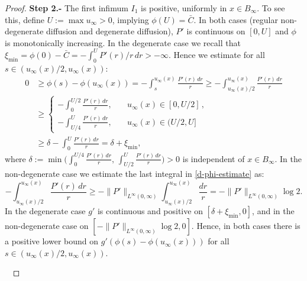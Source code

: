 \documentclass[10pt,a4paper]{amsart}
\newcommand{\uinf}{u_\infty}
\begin{document}
\begin{proof}
{\bf Step 2.-} The first infimum $I_1$ is positive, uniformly in $x\in B_\infty$. To see this, define $U:=\max u_\infty>0$, implying $\phi(U)=\bar C$. In both cases (regular non-degenerate diffusion and degenerate diffusion), $P'$ is continuous on $[0,U]$ and $\phi$ is monotonically increasing.    
In the degenerate case we recall that $\xi_{\min}=\phi(0)-\bar C=-\int_0^U P'(r)/r\,dr>-\infty$.
Hence we estimate for all $s\in(\uinf(x)/2,\uinf(x))$: 
\begin{align}\label{d-phi-estimate}
        0 &\ge \phi(s) - \phi(\uinf(x)) = - \int_s^{\uinf(x)}\frac{P'(r)\,dr}r 
        \ge - \int_{\uinf(x)/2}^{\uinf(x)}\frac{P'(r)\,dr}{r} \\
    &\ge
    \begin{cases}
        - \int_{0}^{U/2}\frac{P'(r)\,dr}{r}, \quad & u_\infty(x)\in[0,U/2]\,,\\
        - \int_{U/4}^{U}\frac{P'(r)\,dr}{r}, \quad & u_\infty(x)\in(U/2,U]
    \end{cases}  \nonumber \\
    &\ge \delta - \int_0^U \frac{P'(r)\,dr}{r}  = \delta+\xi_{\min} , \nonumber 
\end{align}
where $\delta:=\min\Big(\int_{0}^{U/4}\frac{P'(r)\,dr}{r},\,\int_{U/2}^{U}\frac{P'(r)\,dr}{r}\Big)>0$ is independent of $x\in B_\infty$. 
In the non-degenerate case we estimate the last integral in \eqref{d-phi-estimate} as:
$$
  - \int_{\uinf(x)/2}^{\uinf(x)}\frac{P'(r)\,dr}{r} 
        \ge -\|P'\|_{L^\infty(0,\infty)} \int_{\uinf(x)/2}^{\uinf(x)}\frac{dr}{r} =-\|P'\|_{L^\infty(0,\infty)} \log 2.
$$
In the degenerate case $g'$ is continuous and positive on $[\delta+\xi_{\min},0]$, and in the non-degenerate case on $[-\|P'\|_{L^\infty(0,\infty)} \log 2,0]$. Hence, in both cases there is a positive lower bound on $g'(\phi(s)-\phi(\uinf(x)))$ for all $s\in(\uinf(x)/2,\uinf(x))$. 

\


\end{proof}
\end{document}
